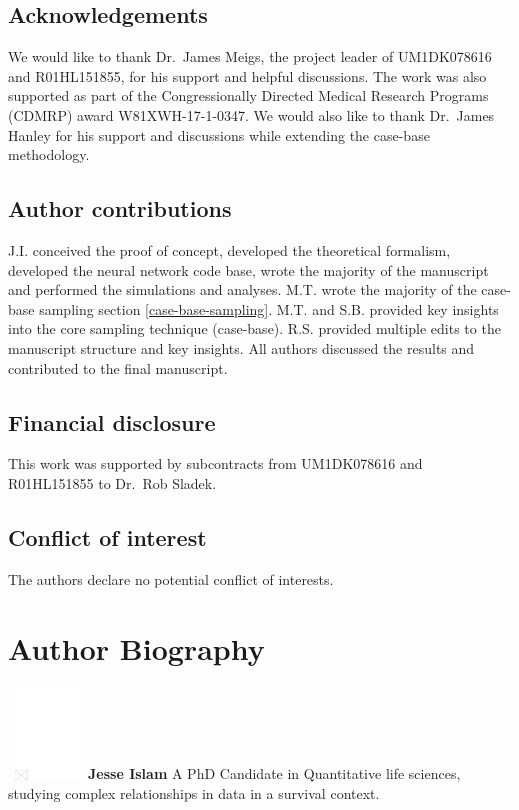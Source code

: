 \documentclass[APA,LATO1COL]{WileyNJD-v2}
\begin{document}
\hypertarget{acknowledgements}{%
\subsection*{Acknowledgements}\label{acknowledgements}}

We would like to thank Dr.~James Meigs, the project
leader of UM1DK078616 and R01HL151855, for his support and helpful discussions. The
work was also supported as part of the Congressionally Directed Medical
Research Programs (CDMRP) award W81XWH-17-1-0347. We would also like to
thank Dr.~James Hanley for his support and discussions while extending
the case-base methodology.

\subsection*{Author contributions}

J.I. conceived the proof of concept, developed the theoretical formalism, developed the neural network code base, wrote the majority of the manuscript and performed the simulations and analyses. M.T. wrote the majority of the case-base sampling section \ref{case-base-sampling}. M.T. and S.B. provided key insights into the core sampling technique (case-base). R.S. provided multiple edits to the manuscript structure and key insights. All authors discussed the results and contributed to the final manuscript.

\subsection*{Financial disclosure}

This work was supported by subcontracts from UM1DK078616 and R01HL151855
to Dr.~Rob Sladek. 

\subsection*{Conflict of interest}

The authors declare no potential conflict of interests.


\appendix
%


\section*{Author Biography}

\begin{biography}{\includegraphics[width=60pt,height=70pt,draft]{empty}}{\textbf{Jesse Islam} A PhD Candidate in Quantitative life sciences, studying complex relationships in data in a survival context.}
\end{biography}
\end{document}
